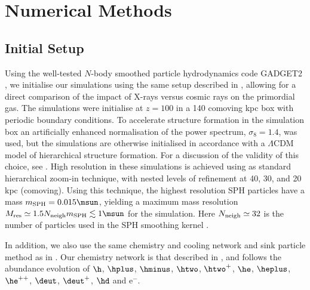 \section{Numerical Methods}
\label{methods}

\subsection{Initial Setup}
\label{setup}

Using the well-tested $N$-body smoothed particle hydrodynamics code GADGET2 \citep{Springel2005}, we initialise our simulations using the same setup described in \citet{Hummeletal2014}, allowing for a direct comparison of the impact of X-rays versus cosmic rays on the primordial gas.  The simulations were initialise at $z=100$ in a 140 comoving kpc box with periodic boundary conditions. To accelerate structure formation in the simulation box an artificially enhanced normalisation of the power spectrum, $\sigma_8 = 1.4$, was used, but the simulations are otherwise initialised in accordance with a $\Lambda$CDM model of hierarchical structure formation. For a discussion of the validity of this choice, see \citet{StacyGreifBromm2010}. High resolution in these simulations is achieved using as standard hierarchical zoom-in technique, with nested levels of refinement at 40, 30, and 20 kpc (comoving).  Using this technique, the highest resolution SPH particles have a mass $m_{\rm SPH} = 0.015\msun$, yielding a maximum mass resolution $M_{\rm res} \simeq 1.5 N_{\rm neigh} m_{\rm SPH} \lesssim 1\msun$ for the simulation.  Here $N_{\rm neigh} \simeq 32$ is the number of particles used in the SPH smoothing kernel \citep{BateBurkert1997}.

In addition, we also use the same chemistry and cooling network and sink particle method as in \citet{Hummeletal2014}.  Our chemistry network is that described in \citet{Greifetal2009b}, and follows the abundance evolution of $\h$, $\hplus$, $\hminus$, $\htwo$, $\htwo^+$, $\he$, $\heplus$, $\he^{++}$, $\deut$, $\deut^+$, $\hd$ and e$^-$.
